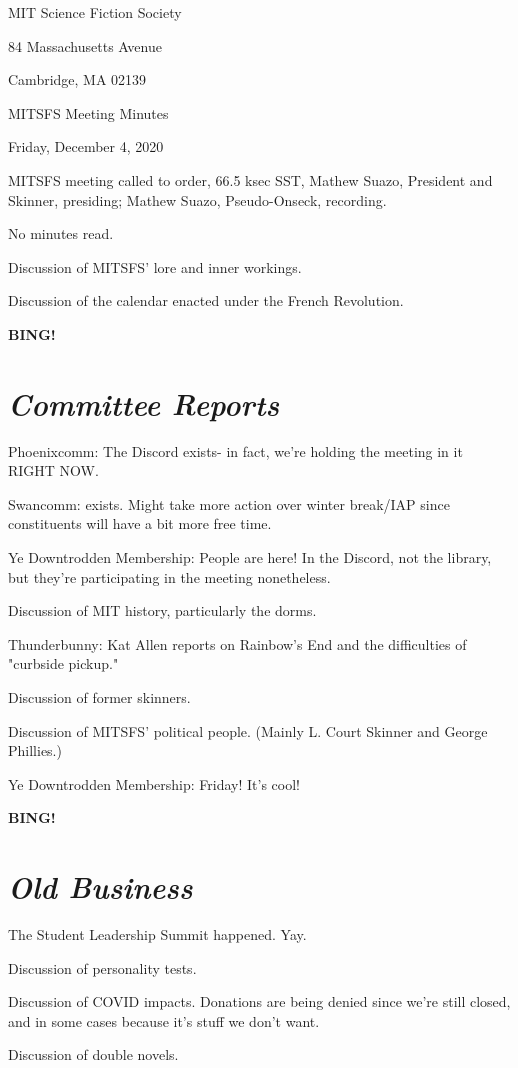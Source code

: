\documentclass[10pt]{article}
\newcommand{\bing}{{\bf BING!} }
\newcommand{\goto}[1]{\bing \vskip 12pt \section*{{\em{#1}}}}
\newcommand{\skinner}{Mathew Suazo, President and Skinner\xspace}
\newcommand{\onseck}{Mathew Suazo, Pseudo-Onseck\xspace}
\newcommand{\meetingdate}{Friday, December 4, 2020}
\begin{document}
\begin{center}

MIT Science Fiction Society

84 Massachusetts Avenue

Cambridge, MA 02139

\vspace{12pt}

MITSFS Meeting Minutes

\meetingdate

\end{center}

\vspace{18pt}

\setlength{\parskip}{6pt}

\noindent
MITSFS meeting called to order, 66.5 ksec SST,
\skinner, presiding; \onseck, recording.

No minutes read.

Discussion of MITSFS' lore and inner workings.

Discussion of the calendar enacted under the French Revolution.

\goto{Committee Reports}

Phoenixcomm: The Discord exists- in fact, we're holding the meeting in it RIGHT NOW.

Swancomm: exists. Might take more action over winter break/IAP since constituents will have a bit more free time.

Ye Downtrodden Membership: People are here! In the Discord, not the library, but they're participating in the meeting nonetheless.

Discussion of MIT history, particularly the dorms.

Thunderbunny: Kat Allen reports on Rainbow's End and the difficulties of "curbside pickup."

Discussion of former skinners.

Discussion of MITSFS' political people. (Mainly L. Court Skinner and George Phillies.)

Ye Downtrodden Membership: Friday! It's cool!

\goto{Old Business}

The Student Leadership Summit happened. Yay.

Discussion of personality tests.

Discussion of COVID impacts. Donations are being denied since we're still closed, and in some cases because it's stuff we don't want.

Discussion of double novels.
\end{document}
